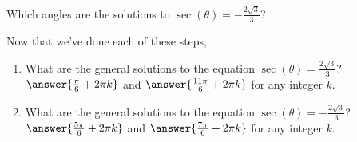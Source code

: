 \documentclass{ximera}
\begin{document}
\begin{exercise}
\begin{exercise}
\begin{exercise}
\begin{exercise}
\begin{exercise}
Which angles are the solutions to $\sec(\theta) = -\frac{2\sqrt{3}}{3}$? 
\begin{multipleChoice}
\end{multipleChoice}


\begin{exercise} Now that we've done each of these steps, 
\begin{enumerate} 
\item What are the general solutions to the equation $\sec(\theta) = \frac{2\sqrt{3}}{3}$? \\
$\answer{\frac{\pi}{6} + 2\pi k}$ and $\answer{\frac{11\pi}{6} + 2\pi k}$ for any integer $k$.

\item What are the general solutions to the equation $\sec(\theta) = -\frac{2\sqrt{3}}{3}$?\\
$\answer{\frac{5\pi}{6} + 2\pi k}$ and $\answer{\frac{7\pi}{6} + 2\pi k}$ for any integer $k$.

\end{enumerate}
	
\end{exercise}	
\end{exercise}
\end{exercise}
\end{exercise}
\end{exercise}
\end{exercise}
\end{document}

